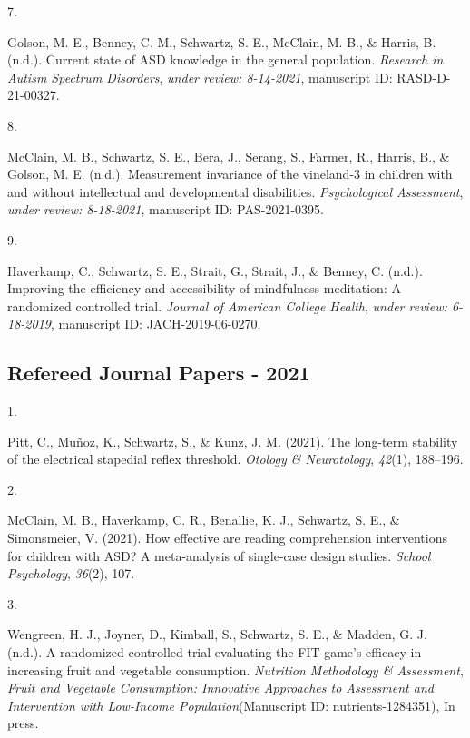 \documentclass[11pt,a4paper,]{moderncv}
\newlength{\csllabelwidth}
\newcommand{\CSLLeftMargin}[1]{\parbox[t]{\csllabelwidth}{#1}}
\newcommand{\CSLRightInline}[1]{\parbox[t]{\linewidth - \csllabelwidth}{#1}}
\begin{document}
\leavevmode{}%
\CSLLeftMargin{7. }
\CSLRightInline{Golson, M. E., Benney, C. M., Schwartz, S. E., McClain,
M. B., \& Harris, B. (n.d.). Current state of ASD knowledge in the
general population. \emph{Research in Autism Spectrum Disorders},
\emph{under review: 8-14-2021}, manuscript ID: RASD-D-21-00327.}

\leavevmode{}%
\CSLLeftMargin{8. }
\CSLRightInline{McClain, M. B., Schwartz, S. E., Bera, J., Serang, S.,
Farmer, R., Harris, B., \& Golson, M. E. (n.d.). Measurement invariance
of the vineland-3 in children with and without intellectual and
developmental disabilities. \emph{Psychological Assessment}, \emph{under
review: 8-18-2021}, manuscript ID: PAS-2021-0395.}

\leavevmode{}%
\CSLLeftMargin{9. }
\CSLRightInline{Haverkamp, C., Schwartz, S. E., Strait, G., Strait, J.,
\& Benney, C. (n.d.). Improving the efficiency and accessibility of
mindfulness meditation: A randomized controlled trial. \emph{Journal of
American College Health}, \emph{under review: 6-18-2019}, manuscript ID:
JACH-2019-06-0270.}

\vspace{7mm}

\hypertarget{refereed-journal-papers---2021}{%
\subsection{\texorpdfstring{\textbf{Refereed Journal Papers -
2021}}{Refereed Journal Papers - 2021}}\label{refereed-journal-papers---2021}}

\hypertarget{refs_journals2021}{}
\leavevmode{}%
\CSLLeftMargin{1. }
\CSLRightInline{Pitt, C., Muñoz, K., Schwartz, S., \& Kunz, J. M.
(2021). The long-term stability of the electrical stapedial reflex
threshold. \emph{Otology \& Neurotology}, \emph{42}(1), 188--196.}

\leavevmode{}%
\CSLLeftMargin{2. }
\CSLRightInline{McClain, M. B., Haverkamp, C. R., Benallie, K. J.,
Schwartz, S. E., \& Simonsmeier, V. (2021). How effective are reading
comprehension interventions for children with ASD? A meta-analysis of
single-case design studies. \emph{School Psychology}, \emph{36}(2),
107.}

\leavevmode{}%
\CSLLeftMargin{3. }
\CSLRightInline{Wengreen, H. J., Joyner, D., Kimball, S., Schwartz, S.
E., \& Madden, G. J. (n.d.). A randomized controlled trial evaluating
the FIT game's efficacy in increasing fruit and vegetable consumption.
\emph{Nutrition Methodology \& Assessment}, \emph{Fruit and Vegetable
Consumption: Innovative Approaches to Assessment and Intervention with
Low-Income Population}(Manuscript ID: nutrients-1284351), In press.}
\end{document}
